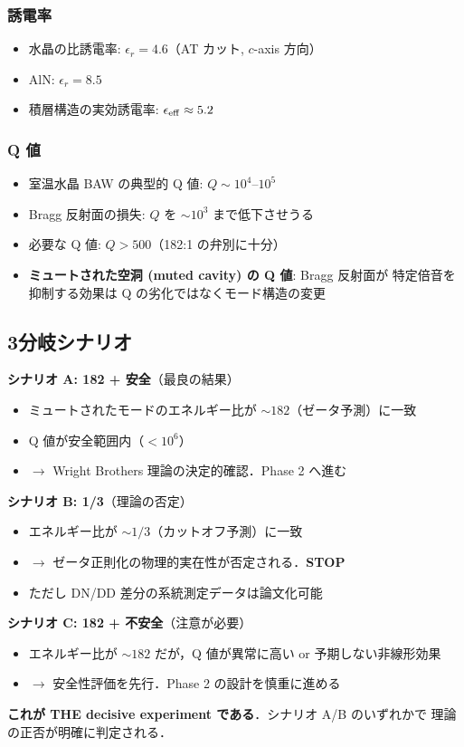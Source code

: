 \subsubsection{誘電率}

\begin{itemize}
\item 水晶の比誘電率: $\epsilon_r = 4.6$（AT カット, $c$-axis 方向）
\item AlN: $\epsilon_r = 8.5$
\item 積層構造の実効誘電率: $\epsilon_{\rm eff} \approx 5.2$
\end{itemize}

\subsubsection{Q 値}

\begin{itemize}
\item 室温水晶 BAW の典型的 Q 値: $Q \sim 10^4$--$10^5$
\item Bragg 反射面の損失: $Q$ を $\sim 10^3$ まで低下させうる
\item 必要な Q 値: $Q > 500$（182:1 の弁別に十分）
\item \textbf{ミュートされた空洞 (muted cavity) の Q 値}: Bragg 反射面が
  特定倍音を抑制する効果は Q の劣化ではなくモード構造の変更
\end{itemize}

\subsection{3分岐シナリオ}

\begin{gostopbox}
\textbf{シナリオ A: 182 + 安全}（最良の結果）
\begin{itemize}
\item ミュートされたモードのエネルギー比が $\sim 182$（ゼータ予測）に一致
\item Q 値が安全範囲内（$< 10^6$）
\item $\to$ Wright Brothers 理論の決定的確認．Phase 2 へ進む
\end{itemize}

\textbf{シナリオ B: 1/3}（理論の否定）
\begin{itemize}
\item エネルギー比が $\sim 1/3$（カットオフ予測）に一致
\item $\to$ ゼータ正則化の物理的実在性が否定される．\textbf{STOP}
\item ただし DN/DD 差分の系統測定データは論文化可能
\end{itemize}

\textbf{シナリオ C: 182 + 不安全}（注意が必要）
\begin{itemize}
\item エネルギー比が $\sim 182$ だが，Q 値が異常に高い or
  予期しない非線形効果
\item $\to$ 安全性評価を先行．Phase 2 の設計を慎重に進める
\end{itemize}

\textbf{これが THE decisive experiment である}．シナリオ A/B のいずれかで
理論の正否が明確に判定される．
\end{gostopbox}

